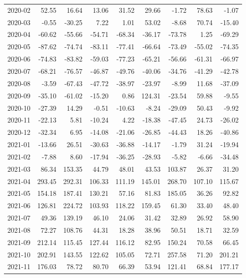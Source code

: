 \begin{table}[ht]
\begin{tabular}{lrrrrrrrr}
  2020-02 & 52.55 & 16.64 & 13.06 & 31.52 & 29.66 & -1.72 & 78.63 & -1.07 \\ 
  2020-03 & -0.55 & -30.25 & 7.22 & 1.01 & 53.02 & -8.68 & 70.74 & -15.40 \\ 
  2020-04 & -60.62 & -55.66 & -54.71 & -68.34 & -36.17 & -73.78 & 1.25 & -69.29 \\ 
  2020-05 & -87.62 & -74.74 & -83.11 & -77.41 & -66.64 & -73.49 & -55.02 & -74.35 \\ 
  2020-06 & -74.83 & -83.82 & -59.03 & -77.23 & -65.21 & -56.66 & -61.31 & -66.97 \\ 
  2020-07 & -68.21 & -76.57 & -46.87 & -49.76 & -40.06 & -34.76 & -41.29 & -42.78 \\ 
  2020-08 & -3.59 & -67.43 & -47.72 & -38.97 & -23.97 & -8.99 & 11.68 & -37.09 \\ 
  2020-09 & -35.10 & -61.02 & -15.20 & 0.86 & 124.31 & -23.54 & 59.88 & -9.55 \\ 
  2020-10 & -27.39 & 14.29 & -0.51 & -10.63 & -8.24 & -29.09 & 50.43 & -9.92 \\ 
  2020-11 & -22.13 & 5.81 & -10.24 & 4.22 & -18.38 & -47.45 & 24.73 & -26.02 \\ 
  2020-12 & -32.34 & 6.95 & -14.08 & -21.06 & -26.85 & -44.43 & 18.26 & -40.86 \\ 
  2021-01 & -13.66 & 26.51 & -30.63 & -36.88 & -14.17 & -1.79 & 31.24 & -19.94 \\ 
  2021-02 & -7.88 & 8.60 & -17.94 & -36.25 & -28.93 & -5.82 & -6.66 & -34.48 \\ 
  2021-03 & 86.34 & 153.35 & 44.79 & 48.01 & 43.53 & 103.87 & 26.37 & 31.20 \\ 
  2021-04 & 293.45 & 292.31 & 106.33 & 111.19 & 145.01 & 268.70 & 107.10 & 115.67 \\ 
  2021-05 & 154.18 & 187.41 & 130.21 & 57.16 & 81.83 & 185.05 & 36.26 & 92.82 \\ 
  2021-06 & 126.81 & 224.72 & 103.93 & 118.22 & 159.45 & 61.30 & 33.40 & 48.40 \\ 
  2021-07 & 49.36 & 139.19 & 46.10 & 24.06 & 31.42 & 32.89 & 26.92 & 58.90 \\ 
  2021-08 & 72.27 & 108.76 & 44.31 & 18.28 & 38.96 & 50.51 & 18.71 & 32.59 \\ 
  2021-09 & 212.14 & 115.45 & 127.44 & 116.12 & 82.95 & 150.24 & 70.58 & 66.45 \\ 
  2021-10 & 202.91 & 143.55 & 122.62 & 105.05 & 72.71 & 257.58 & 71.20 & 201.21 \\ 
  2021-11 & 176.03 & 78.72 & 80.70 & 66.39 & 53.94 & 121.41 & 68.84 & 177.17 \\ 

\end{tabular}
\end{table}
